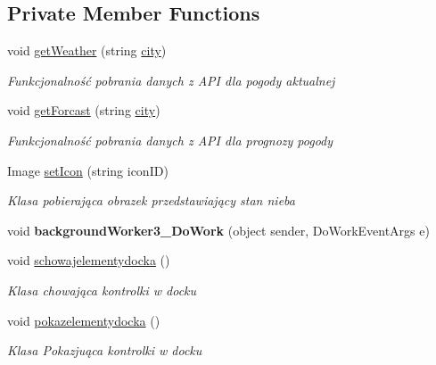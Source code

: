 \subsection*{Private Member Functions}
\begin{DoxyCompactItemize}
\item 
void \mbox{\hyperlink{class_pogodynka__w57003_1_1panel__glony_a1b552bb32257c708d4c7755b60cb54a0}{get\+Weather}} (string \mbox{\hyperlink{class_pogodynka__w57003_1_1city}{city}})
\begin{DoxyCompactList}\small\item\em Funkcjonalność pobrania danych z A\+PI dla pogody aktualnej \end{DoxyCompactList}\item 
void \mbox{\hyperlink{class_pogodynka__w57003_1_1panel__glony_aa08ea57aa456c27766dcb8d032478d4b}{get\+Forcast}} (string \mbox{\hyperlink{class_pogodynka__w57003_1_1city}{city}})
\begin{DoxyCompactList}\small\item\em Funkcjonalność pobrania danych z A\+PI dla prognozy pogody \end{DoxyCompactList}\item 
Image \mbox{\hyperlink{class_pogodynka__w57003_1_1panel__glony_a92d766dd29d34e246e2e99deb2591b82}{set\+Icon}} (string icon\+ID)
\begin{DoxyCompactList}\small\item\em Klasa pobierająca obrazek przedstawiający stan nieba \end{DoxyCompactList}\item 
\mbox{\label{class_pogodynka__w57003_1_1panel__glony_aaf474a16b7accdb4f5fba157d91d7286}} 
void {\bfseries background\+Worker3\+\_\+\+Do\+Work} (object sender, Do\+Work\+Event\+Args e)
\item 
void \mbox{\hyperlink{class_pogodynka__w57003_1_1panel__glony_ad2d405552ab48f25e21c26c78cb660b4}{schowajelementydocka}} ()
\begin{DoxyCompactList}\small\item\em Klasa chowająca kontrolki w docku \end{DoxyCompactList}\item 
void \mbox{\hyperlink{class_pogodynka__w57003_1_1panel__glony_a40e7412c72125b4544218fb03a4af1d3}{pokazelementydocka}} ()
\begin{DoxyCompactList}\small\item\em Klasa Pokazjuąca kontrolki w docku \end{DoxyCompactList}\item 

\end{DoxyCompactItemize}
